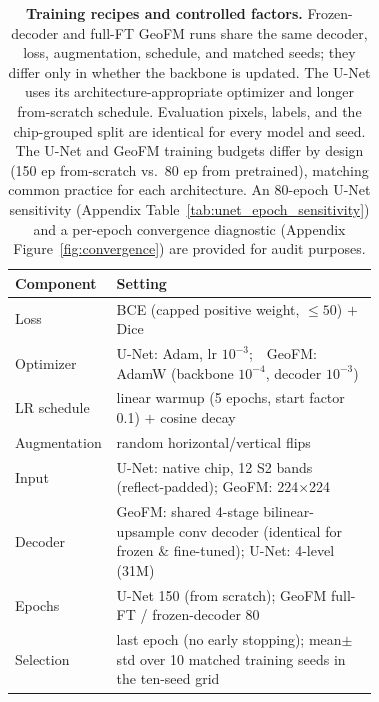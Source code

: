 \documentclass{article}
\newcommand{\tablebodygap}{\vspace{0.45em}}
\begin{document}
\begin{table}[!htb]\centering\small
\caption{\textbf{Training recipes and controlled factors.} Frozen-decoder and
full-FT GeoFM runs share the same decoder, loss, augmentation, schedule, and matched
seeds; they differ only in whether the backbone is updated. The U-Net uses its
architecture-appropriate optimizer and longer from-scratch schedule. Evaluation
pixels, labels, and the chip-grouped split are identical for every model and seed.
The U-Net and GeoFM training budgets differ by design (150 ep from-scratch vs.\ 80 ep
from pretrained), matching common practice for each architecture. An 80-epoch U-Net
sensitivity (Appendix Table~\ref{tab:unet_epoch_sensitivity}) and a per-epoch
convergence diagnostic (Appendix Figure~\ref{fig:convergence}) are provided for audit
purposes.}
\label{tab:recipe}
\tablebodygap
\begin{tabular}{l p{0.72\linewidth}}
\toprule
Component & Setting \\
\midrule
Loss            & BCE (capped positive weight, $\le 50$) $+$ Dice \\
Optimizer       & U-Net: Adam, lr $10^{-3}$;\ \ GeoFM: AdamW (backbone $10^{-4}$, decoder $10^{-3}$) \\
LR schedule     & linear warmup (5 epochs, start factor 0.1) $+$ cosine decay \\
Augmentation    & random horizontal/vertical flips \\
Input           & U-Net: native chip, 12 S2 bands (reflect-padded); GeoFM: 224$\times$224 \\
Decoder         & GeoFM: shared 4-stage bilinear-upsample conv decoder (identical for frozen \& fine-tuned); U-Net: 4-level (31M) \\
Epochs          & U-Net 150 (from scratch); GeoFM full-FT / frozen-decoder 80 \\
Selection       & last epoch (no early stopping); mean$\pm$std over 10 matched training seeds in the ten-seed grid \\
\bottomrule
\end{tabular}
\end{table}
\end{document}
